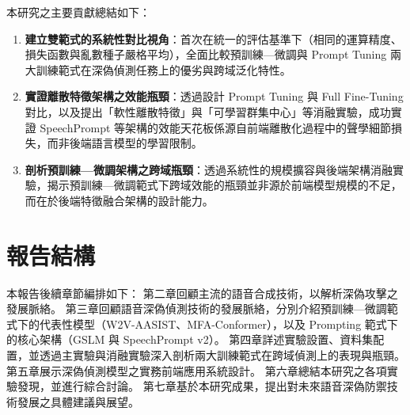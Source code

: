 本研究之主要貢獻總結如下：
\begin{enumerate}
    \item \textbf{建立雙範式的系統性對比視角}：首次在統一的評估基準下（相同的運算精度、損失函數與亂數種子嚴格平均），全面比較預訓練—微調與 Prompt Tuning 兩大訓練範式在深偽偵測任務上的優劣與跨域泛化特性。
    \item \textbf{實證離散特徵架構之效能瓶頸}：透過設計 Prompt Tuning 與 Full Fine-Tuning 對比，以及提出「軟性離散特徵」與「可學習群集中心」等消融實驗，成功實證 SpeechPrompt 等架構的效能天花板係源自前端離散化過程中的聲學細節損失，而非後端語言模型的學習限制。
    \item \textbf{剖析預訓練—微調架構之跨域瓶頸}：透過系統性的規模擴容與後端架構消融實驗，揭示預訓練—微調範式下跨域效能的瓶頸並非源於前端模型規模的不足，而在於後端特徵融合架構的設計能力。
\end{enumerate}

\section{報告結構}
本報告後續章節編排如下：
第二章回顧主流的語音合成技術，以解析深偽攻擊之發展脈絡。
第三章回顧語音深偽偵測技術的發展脈絡，分別介紹預訓練—微調範式下的代表性模型（W2V-AASIST、MFA-Conformer），以及 Prompting 範式下的核心架構（GSLM 與 SpeechPrompt v2）。
第四章詳述實驗設置、資料集配置，並透過主實驗與消融實驗深入剖析兩大訓練範式在跨域偵測上的表現與瓶頸。
第五章展示深偽偵測模型之實務前端應用系統設計。
第六章總結本研究之各項實驗發現，並進行綜合討論。
第七章基於本研究成果，提出對未來語音深偽防禦技術發展之具體建議與展望。
